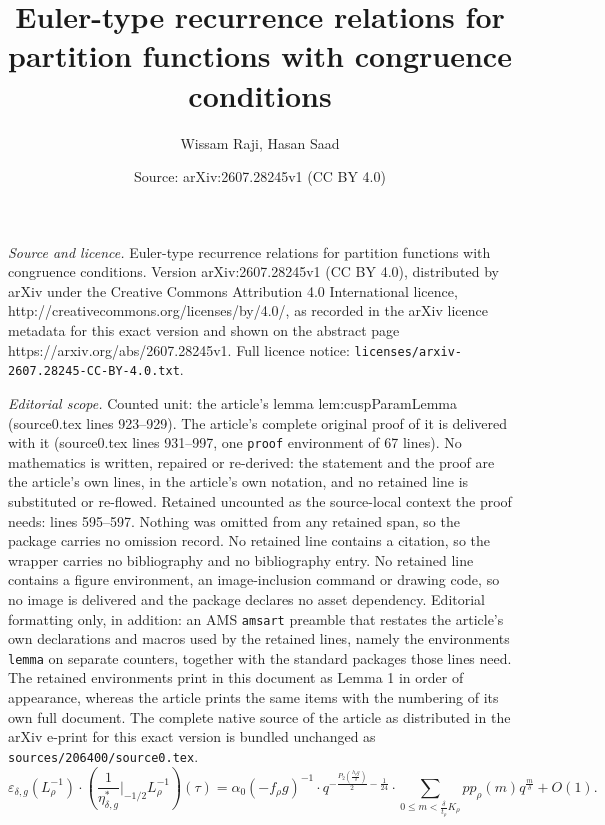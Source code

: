 \documentclass[10pt,a4paper]{amsart}
\title{Euler-type recurrence relations for partition functions with congruence conditions}
\author{Wissam Raji, Hasan Saad}
\date{Source: arXiv:2607.28245v1 (CC BY 4.0)}
\begin{document}
\maketitle

\noindent\emph{Source and licence.} Euler-type recurrence relations for partition functions with congruence conditions. Version arXiv:2607.28245v1 (CC BY 4.0), distributed by arXiv under the Creative Commons Attribution 4.0 International licence, http://creativecommons.org/licenses/by/4.0/, as recorded in the arXiv licence metadata for this exact version and shown on the abstract page https://arxiv.org/abs/2607.28245v1. Full licence notice: \texttt{licenses/arxiv-2607.28245-CC-BY-4.0.txt}.\par\smallskip

\noindent\textit{Editorial scope.} Counted unit: the article's lemma lem:cuspParamLemma (source0.tex lines 923--929). The article's complete original proof of it is delivered with it (source0.tex lines 931--997, one \texttt{proof} environment of 67 lines). No mathematics is written, repaired or re-derived: the statement and the proof are the article's own lines, in the article's own notation, and no retained line is substituted or re-flowed.  Retained uncounted as the source-local context the proof needs: lines 595--597.  Nothing was omitted from any retained span, so the package carries no omission record.  No retained line contains a citation, so the wrapper carries no bibliography and no bibliography entry.  No retained line contains a figure environment, an image-inclusion command or drawing code, so no image is delivered and the package declares no asset dependency.  Editorial formatting only, in addition: an AMS \texttt{amsart} preamble that restates the article's own declarations and macros used by the retained lines, namely the environments \texttt{lemma} on separate counters, together with the standard packages those lines need.  The retained environments print in this document as Lemma 1 in order of appearance, whereas the article prints the same items with the numbering of its own full document.  The complete native source of the article as distributed in the arXiv e-print for this exact version is bundled unchanged as \texttt{sources/206400/source0.tex}.
		\begin{equation}\label{eq:EtaGenTransAppFourier}
		\varepsilon_{\delta,g}(L_\rho^{-1})\cdot \left(\frac{1}{\eta_{\delta,g}^\ast}\Bigg|_{-1/2}{L_\rho^{-1}}\right)(\tau) = \alpha_0(-f_\rho g)^{-1}\cdot q^{-\frac{P_2\left(\frac{h_\rho g}{\delta}\right)}{2}-\frac{1}{24}}\cdot\sum\limits_{0\leq m<\frac{\delta}{t_\rho}K_\rho} pp_\rho(m)q^{\frac{m}{\delta}} + O(1).
		\end{equation}
\end{document}
